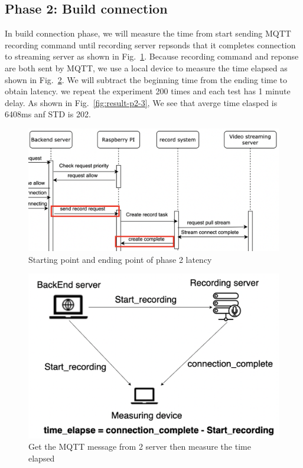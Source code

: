 \subsection{Phase 2: Build connection}
In build connection phase, we will measure the time from start sending MQTT recording command until recording server repsonds that it completes connection to streaming server as shown in Fig.~\ref{fig:result-p2-1}. Because recording command and reponse are both sent by MQTT, we use a local device to measure the time elapsed as shown in Fig.~\ref{fig:result-p2-2}. We will subtract the beginning time from the ending time to obtain latency. we repeat the experiment 200 times and each test has 1 minute delay. As shown in Fig.~\ref{fig:result-p2-3}, We see that averge time elasped is 6408ms anf STD is 202. 

\begin{figure}[H]
    \centering
    \includegraphics[width=\textwidth]{figsrc/result-p2-1.png}
    \caption{Starting point and ending point of phase 2 latency\label{fig:result-p2-1}}
\end{figure}

\begin{figure}[H]
    \centering
    \includegraphics[width=\textwidth]{figsrc/result-p2-2.png}
    \caption{Get the MQTT message from 2 server then measure the time elapsed\label{fig:result-p2-2}}
\end{figure}

